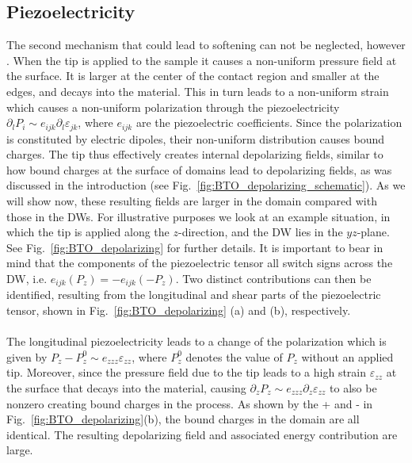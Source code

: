 \subsection{Piezoelectricity \label{sec:BTO_piezoelectricity}}
The second mechanism that could lead to softening can not be neglected, however \cite{Tsuji2005,Stefani2020}.
When the tip is applied to the sample it causes a non-uniform pressure field at the surface.
It is larger at the center of the contact region and smaller at the edges, and decays into the material.
This in turn leads to a non-uniform strain which causes a non-uniform polarization through the piezoelectricity $\partial_l P_i \sim e_{ijk} \partial_l \varepsilon_{jk}$, where $e_{ijk}$ are the piezoelectric coefficients.
Since the polarization is constituted by electric dipoles, their non-uniform distribution causes bound charges.
The tip thus effectively creates internal depolarizing fields, similar to how bound charges at the surface of domains lead to depolarizing fields, as was discussed in the introduction (see Fig.~\ref{fig:BTO_depolarizing_schematic}). 
As we will show now, these resulting fields are larger in the domain compared with those in the DWs.
For illustrative purposes we look at an example situation, in which the tip is applied along the $z$-direction, and the DW lies in the $yz$-plane. See Fig.~\ref{fig:BTO_depolarizing} for further details.
It is important to bear in mind that the components of the piezoelectric tensor all switch signs across the DW, i.e. $e_{ijk}(P_z) = - e_{ijk}(-P_z)$. 
Two distinct contributions can then be identified, resulting from the longitudinal and shear parts of the piezoelectric tensor, shown in Fig.~\ref{fig:BTO_depolarizing} (a) and (b), respectively.
\\\\
The longitudinal piezoelectricity leads to a change of the polarization which is given by $P_z - P^0_z \sim e_{zzz} \varepsilon_{zz}$, where $P^0_z$ denotes the value of $P_z$ without an applied tip.
Moreover, since the pressure field due to the tip leads to a high strain $\varepsilon_{zz}$ at the surface that decays into the material, causing $\partial_{z} P_z \sim e_{zzz} \partial_z \varepsilon_{zz}$ to also be nonzero creating bound charges in the process.
As shown by the + and - in Fig.~\ref{fig:BTO_depolarizing}(b), the bound charges in the domain are all identical.
The resulting depolarizing field and associated energy contribution are large.

